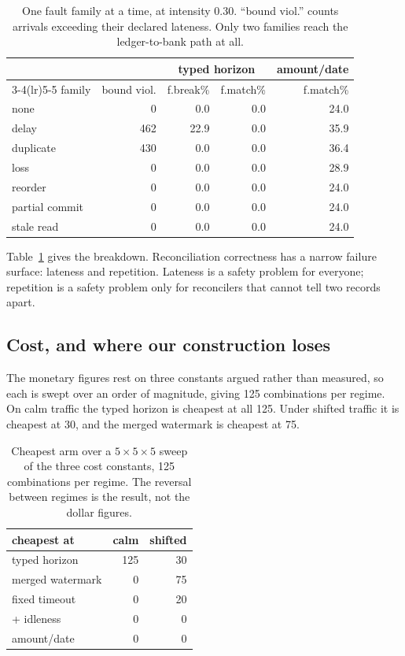 \documentclass[10pt,conference]{IEEEtran}
\begin{document}
\begin{table}[t]
\caption{One fault family at a time, at intensity 0.30. ``bound viol.'' counts
arrivals exceeding their declared lateness. Only two families reach the
ledger-to-bank path at all.}
\label{tab:families}
\centering
\footnotesize
\begin{tabular}{lrrrr}
\toprule
& & \multicolumn{2}{c}{typed horizon} & amount/date \\
\cmidrule(lr){3-4}\cmidrule(lr){5-5}
family & bound viol. & f.break\% & f.match\% & f.match\% \\
\midrule
none            &   0 &  0.0 & 0.0 & 24.0 \\
delay           & 462 & 22.9 & 0.0 & 35.9 \\
duplicate       & 430 &  0.0 & 0.0 & 36.4 \\
loss            &   0 &  0.0 & 0.0 & 28.9 \\
reorder         &   0 &  0.0 & 0.0 & 24.0 \\
partial commit  &   0 &  0.0 & 0.0 & 24.0 \\
stale read      &   0 &  0.0 & 0.0 & 24.0 \\
\bottomrule
\end{tabular}
\end{table}

Table~\ref{tab:families} gives the breakdown.
Reconciliation correctness has a narrow failure surface: lateness and
repetition. Lateness is a safety problem for everyone; repetition is a safety
problem only for reconcilers that cannot tell two records apart.

\subsection{Cost, and where our construction loses}

The monetary figures rest on three constants argued rather than measured, so
each is swept over an order of magnitude, giving 125 combinations per regime. On
calm traffic the typed horizon is cheapest at all 125. Under shifted traffic it
is cheapest at 30, and the merged watermark is cheapest at 75.

\begin{table}[t]
\caption{Cheapest arm over a $5\times5\times5$ sweep of the three cost
constants, 125 combinations per regime. The reversal between regimes is the
result, not the dollar figures.}
\label{tab:cost}
\centering
\footnotesize
\begin{tabular}{lrr}
\toprule
cheapest at & calm & shifted \\
\midrule
typed horizon    & 125 & 30 \\
merged watermark &   0 & 75 \\
fixed timeout    &   0 & 20 \\
\quad + idleness &   0 &  0 \\
amount/date      &   0 &  0 \\
\bottomrule
\end{tabular}
\end{table}
\end{document}
